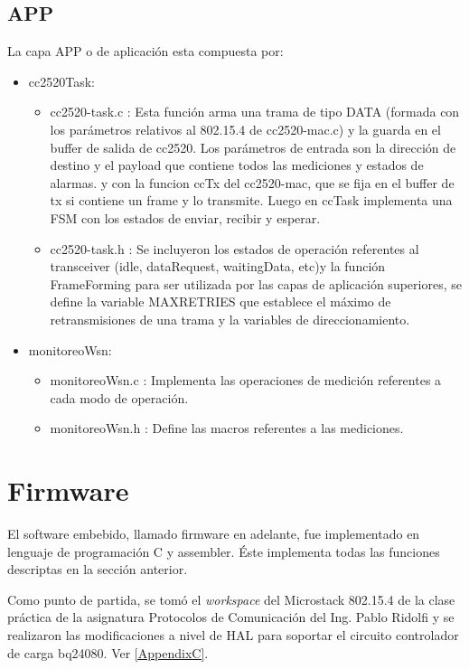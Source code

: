 {\subsection{APP}
\label{subsec:app}
La capa APP	o de aplicación esta compuesta por:
\begin{itemize}
\item cc2520Task:
	\begin{itemize}
	\item cc2520-task.c : Esta función arma una trama de tipo DATA (formada con los parámetros relativos al 802.15.4 de cc2520-mac.c) y la guarda en el buffer de salida de cc2520. Los parámetros de entrada son la dirección de destino y el payload que contiene todos las mediciones y estados de alarmas. y con la funcion ccTx del cc2520-mac, que se fija en el buffer de tx si contiene un frame y lo transmite. Luego en ccTask implementa una FSM con los estados de enviar, recibir y esperar.
	\item cc2520-task.h : Se incluyeron los estados de operación referentes al transceiver (idle, dataRequest, waitingData, etc)y la función FrameForming para ser utilizada por las capas de aplicación superiores, se define la variable MAXRETRIES que establece el máximo de retransmisiones de una trama y la variables de direccionamiento.
	\end{itemize}
\item monitoreoWsn:	
	\begin{itemize}
	\item monitoreoWsn.c : Implementa las operaciones de medición referentes a cada modo de operación.
	\item monitoreoWsn.h : Define las macros referentes a las mediciones.
	\end{itemize}
\end{itemize}
\section{Firmware}
\label{sec:firm}
El software embebido, llamado firmware en adelante, fue implementado en lenguaje de programación C y assembler. Éste implementa todas las funciones descriptas en la sección anterior.
 
Como punto de partida, se tomó el \textit{workspace} del Microstack 802.15.4 de la clase práctica de la asignatura Protocolos de Comunicación del Ing. Pablo Ridolfi y se realizaron las modificaciones a nivel de HAL para soportar el circuito controlador de carga bq24080. Ver \ref{AppendixC}.

}
